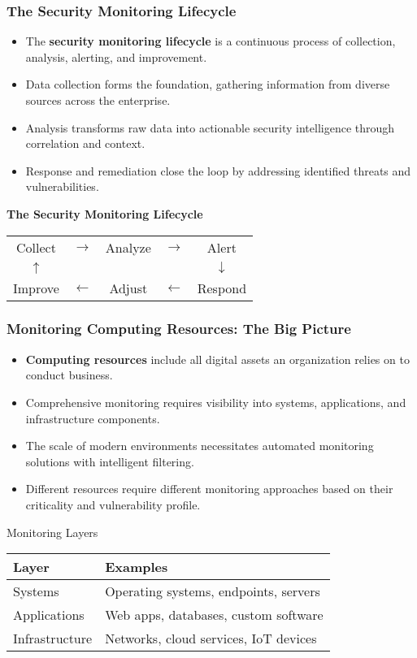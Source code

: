 \documentclass{beamer}
\begin{document}
\begin{frame}
\frametitle{The Security Monitoring Lifecycle}
\begin{itemize}
\item The \textbf{security monitoring lifecycle} is a continuous process of collection, analysis, alerting, and improvement.
\item Data collection forms the foundation, gathering information from diverse sources across the enterprise.
\item Analysis transforms raw data into actionable security intelligence through correlation and context.
\item Response and remediation close the loop by addressing identified threats and vulnerabilities.
\end{itemize}

\begin{center}
\textbf{The Security Monitoring Lifecycle}

\begin{tabular}{ccccc}
Collect & $\rightarrow$ & Analyze & $\rightarrow$ & Alert \\
$\uparrow$ & & & & $\downarrow$ \\
Improve & $\leftarrow$ & Adjust & $\leftarrow$ & Respond \\
\end{tabular}
\end{center}
\end{frame}

\begin{frame}
\frametitle{Monitoring Computing Resources: The Big Picture}
\begin{itemize}
\item \textbf{Computing resources} include all digital assets an organization relies on to conduct business.
\item Comprehensive monitoring requires visibility into systems, applications, and infrastructure components.
\item The scale of modern environments necessitates automated monitoring solutions with intelligent filtering.
\item Different resources require different monitoring approaches based on their criticality and vulnerability profile.
\end{itemize}

\begin{block}{Monitoring Layers}
\begin{tabular}{ll}
\textbf{Layer} & \textbf{Examples} \\
\hline
Systems & Operating systems, endpoints, servers \\
Applications & Web apps, databases, custom software \\
Infrastructure & Networks, cloud services, IoT devices \\
\end{tabular}
\end{block}
\end{frame}
\end{document}
